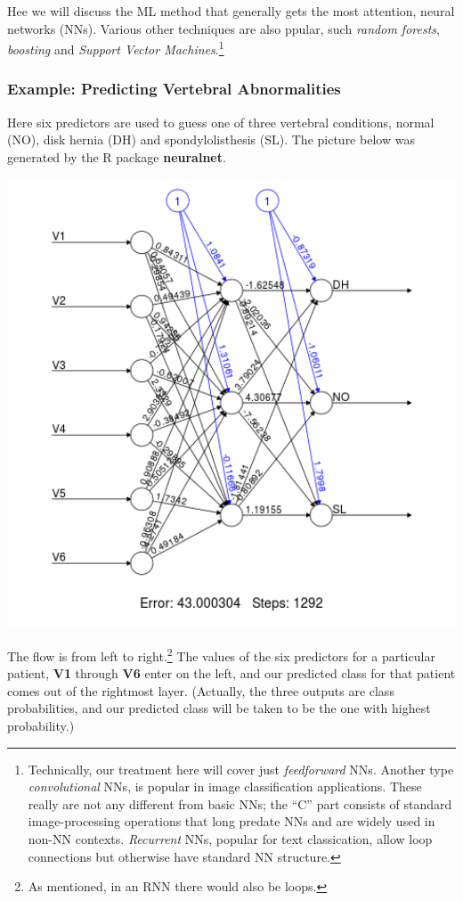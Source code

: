 Hee we will discuss the ML method that generally gets the most
attention, neural networks (NNs).  Various other techniques are also
ppular, such \textit{random forests}, \textit{boosting} and
\textit{Support Vector Machines}.\footnote{Technically, our treatment
here will cover just \textit{feedforward} NNs.  Another type
\textit{convolutional} NNs, is popular in image classification
applications.  These really are not any different from basic NNs; the
``C'' part consists of standard image-processing operations that long
predate NNs and are widely used in non-NN contexts.  \textit{Recurrent}
NNs, popular for text classication, allow loop connections but otherwise
have standard NN structure.}

\subsubsection{Example: Predicting Vertebral Abnormalities}

Here six predictors are used to guess one of three vertebral conditions,
normal (NO), disk hernia (DH) and spondylolisthesis (SL).  The picture
below was generated by the R package \textbf{neuralnet}.

\includegraphics[width=5.6in]{Images/VertebraeNN.png} 

The flow is from left to right.\footnote{As mentioned, in an RNN there
would also be loops.}  The values of the six predictors for a particular
patient, \textbf{V1} through \textbf{V6} enter on the left, and our
predicted class for that patient comes out of the rightmost layer.
(Actually, the three outputs are class probabilities, and our predicted
class will be taken to be the one with highest probability.)

